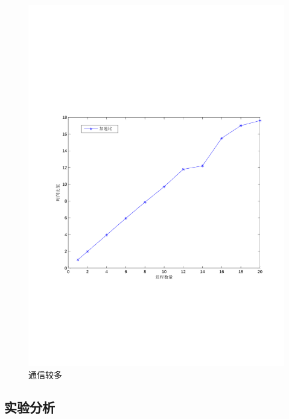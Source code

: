 \documentclass[UTF8]{ctexart}
\begin{document}
\begin{figure}[!htbp]
\begin{minipage}[t]{0.5\linewidth}
    \includegraphics[width=\textwidth]{fig/fig07.pdf}
    \caption{通信较多 \label{sec4:subsec3:fg2}}
  \end{minipage}
\end{figure}

\subsection{实验分析}
\end{document}
